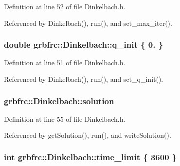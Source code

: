 Definition at line 52 of file Dinkelbach.\+h.



Referenced by Dinkelbach(), run(), and set\+\_\+max\+\_\+iter().

\subsubsection[{\texorpdfstring{q\+\_\+init}{q_init}}]{\setlength{\rightskip}{0pt plus 5cm}double grbfrc\+::\+Dinkelbach\+::q\+\_\+init \{ 0. \}\hspace{0.3cm}{\ttfamily [private]}}\hypertarget{classgrbfrc_1_1Dinkelbach_aa5ef5cdb3b0b29aee7eeb61c947c2a4d}{}\label{classgrbfrc_1_1Dinkelbach_aa5ef5cdb3b0b29aee7eeb61c947c2a4d}


Definition at line 51 of file Dinkelbach.\+h.



Referenced by Dinkelbach(), run(), and set\+\_\+q\+\_\+init().

\subsubsection[{\texorpdfstring{solution}{solution}}]{ grbfrc\+::\+Dinkelbach\+::solution\hspace{0.3cm}{\ttfamily [private]}}\hypertarget{classgrbfrc_1_1Dinkelbach_a2b704289f15a68055ac48167119cc69e}{}\label{classgrbfrc_1_1Dinkelbach_a2b704289f15a68055ac48167119cc69e}


Definition at line 55 of file Dinkelbach.\+h.



Referenced by get\+Solution(), run(), and write\+Solution().

\subsubsection[{\texorpdfstring{time\+\_\+limit}{time_limit}}]{\setlength{\rightskip}{0pt plus 5cm}int grbfrc\+::\+Dinkelbach\+::time\+\_\+limit \{ 3600 \}\hspace{0.3cm}{\ttfamily [private]}}\hypertarget{classgrbfrc_1_1Dinkelbach_adc23446f0c5a966a0476c4fc60bb47a6}{}\label{classgrbfrc_1_1Dinkelbach_adc23446f0c5a966a0476c4fc60bb47a6}



